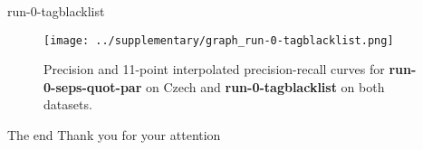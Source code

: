 \documentclass{beamer}
\newcommand{\Run}[1]{\textbf{#1}}
\let\Oldinput
\renewcommand{}[1]{\resizebox{\textwidth}{!}{\Oldinput{#1}}}
\begin{document}
\begin{frame}{run-0-tagblacklist}
\begin{table}[h]
\centering

    \caption{Results of \Run{run-0-stopwords-600} on English,
    \Run{run-0-seps-quot-par} on Czech and \Run{run-0-tagblacklist} on both
    datasets.\label{tbl:run-0-tagblacklist}}
\end{table}

\begin{figure}[h]
\centering
\texttt{[image: ../supplementary/graph\_run-0-tagblacklist.png]}
    \caption{Precision and 11-point interpolated precision-recall curves for
    \Run{run-0-seps-quot-par} on Czech and \Run{run-0-tagblacklist} on both
    datasets.\label{fig:run-0-tagblacklist}}
\end{figure}
\end{frame}

\begin{frame}{The end}
    \Large
    \centering
    Thank you for your attention
\end{frame}
\end{document}
